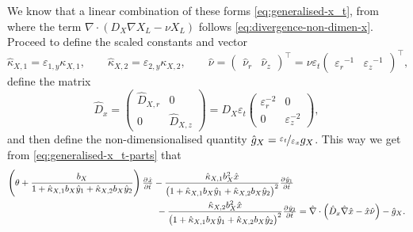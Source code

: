 \documentclass[11pt]{article}
\begin{document}
We know that a linear combination of these forms \eqref{eq:generalised-x_t}, from where the term \(\nabla \cdot (D_X \nabla X_L - \nu X_L)\) follows \eqref{eq:divergence-non-dimen-x}.
Proceed to define the scaled constants and vector
\[
    \hat{\kappa}_{X,1} = \varepsilon_{1,y} \kappa_{X,1},
    \qquad
    \hat{\kappa}_{X,2} = \varepsilon_{2,y} \kappa_{X,2},
    \qquad
    \hat{\nu} = 
    \begin{pmatrix}   \hat{\nu}_r    &    \hat{\nu}_z    \end{pmatrix}^\top
    =
    \nu \varepsilon_t
    \begin{pmatrix}    {\varepsilon_r}^{-1}    &    {\varepsilon_z}^{-1}
    \end{pmatrix}^\top ,
\]
define the matrix
\[
    \hat{D}_x = 
    \begin{pmatrix}
         \hat{D}_{X,r} & 0 
         \\
        0 &  \hat{D}_{X,z}
    \end{pmatrix}
    =
    D_X \varepsilon_t
    \begin{pmatrix}
         \varepsilon_r^{-2} & 0 
         \\
        0 &  \varepsilon_z^{-2}
    \end{pmatrix}
    ,
\]
and then define the non-dimensionalised quantity \( \hat{g}_X = \nicefrac{\varepsilon_t}{\varepsilon_x} g_X\). This way we get from \eqref{eq:generalised-x_t-parts} that
\begin{equation}
\begin{aligned}
    \left( \theta + \frac{b_X}{1 + \hat{\kappa}_{X,1} b_{X} \hat{y}_1 + \hat{\kappa}_{X,2} b_{X} \hat{y}_2 } \right)  \pd{\hat{x}}{\hat{t}}
    &
    -\frac{\hat{\kappa}_{X,1} b_X^2 \hat{x}}{\big(1+ \hat{\kappa}_{X,1} b_X \hat{y}_1 + \hat{\kappa}_{X,2} b_X \hat{y}_2 \big)^2} \pd{\hat y_1}{\hat t}
    \\
    &\,\,
    -\frac{\hat{\kappa}_{X,2} b_X^2 \hat{x}}{\big(1+ \hat{\kappa}_{X,1} b_X \hat{y}_1 + \hat{\kappa}_{X,2} b_X \hat{y}_2 \big)^2} \pd{\hat y_2}{\hat t}
    =
    \hat{\nabla}
    \cdot
    \left( 
        \hat{D}_x \hat{\nabla} \hat{x} - \hat{x} \hat{\nu}
    \right)
    - \hat{g}_X.
\end{aligned}
\end{equation}
\end{document}
